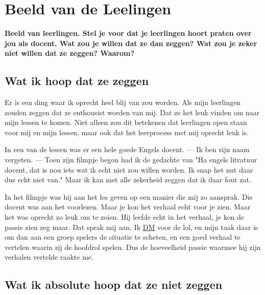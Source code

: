 \documentclass{article}
\begin{document}
    
    \section{Beeld van de Leelingen}
        
        \textbf{Beeld van leerlingen. Stel je voor dat je leerlingen hoort praten over jou als docent. Wat zou je willen dat ze dan zeggen? Wat zou je zeker niet willen dat ze zeggen? Waarom?}
        
        \subsection{Wat ik hoop dat ze zeggen}

            Er is een ding waar ik oprecht heel blij van zou worden. Als mijn leerlingen zouden zeggen dat ze enthousist worden van mij. Dat ze het leuk vinden om naar mijn lessen te komen. Niet alleen zou dit betekenen dat leerlingen open staan voor mij en mijn lessen, maar ook dat het leerprocess met mij oprecht leuk is. 
            
            In een van de lessen was er een hele goede Engels docent. — Ik ben zijn naam vergeten. — Toen zijn filmpje begon had ik de gedachte van "Ha engels litratuur docent, dat is nou iets wat ik echt niet zou willen worden. Ik snap het nut daar dus echt niet van." Maar ik kan met alle zekerheid zeggen dat ik daar fout zat. 
            
            In het filmpje was hij aan het les geven op een manier die mij zo aansprak. Die docent was aan het voorlezen. Maar je kon het verhaal echt voor je zien. Maar het was oprecht zo leuk om te zoien. Hij leefde echt in het verhaal, je kon de passie zien zeg maar. Dat sprak mij aan. Ik \hyperlink{https://en.wikipedia.org/wiki/Dungeon_Master}{\underline{DM}} voor de lol, en mijn taak daar is om dan aan een groep spelers de situatie te scheten, en een goed verhaal te vertelen waarin zij de hoofdrol spelen. Dus de hoeveelheid passie waarmee hij zijn verhalen vertelde raakte me.
        
        \subsection{Wat ik absolute hoop dat ze niet zeggen}
\end{document}

